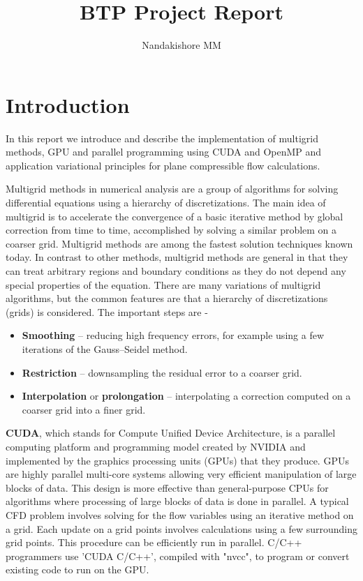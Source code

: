 \documentclass[a4paper]{report}
\author{Nandakishore MM}
\title{BTP Project Report}
\begin{document}
	\maketitle
	
	\newpage
	\tableofcontents
	\newpage
	\listoffigures
	\newpage
	\listoftables
	\newpage
	
	
	\chapter{Introduction}
	In this report we introduce and describe the implementation of multigrid methods, GPU and parallel programming using CUDA and OpenMP and application variational principles for plane compressible flow calculations. 
	
	Multigrid methods in numerical analysis are a group of algorithms for solving differential equations using a hierarchy of discretizations.
	The main idea of multigrid is to accelerate the convergence of a basic iterative method by global correction from time to time, accomplished by solving a similar problem on a coarser grid.
	Multigrid methods are among the fastest solution techniques known today.
	In contrast to other methods, multigrid methods are general in that they can treat arbitrary regions and boundary conditions as they do not depend any special properties of the equation.
	There are many variations of multigrid algorithms, but the common features are that a hierarchy of discretizations (grids) is considered. The important steps are \cite{multigrid}-
	\begin{itemize}
		\item \textbf{Smoothing} – reducing high frequency errors, for example using a few iterations of the Gauss–Seidel method.
		\item \textbf{Restriction} – downsampling the residual error to a coarser grid.
		\item \textbf{Interpolation} or \textbf{prolongation} – interpolating a correction computed on a coarser grid into a finer grid.
	\end{itemize}
	
	\textbf{CUDA}, which stands for Compute Unified Device Architecture, is a parallel computing platform and programming model created by NVIDIA and implemented by the graphics processing units (GPUs) that they produce.
	GPUs are highly parallel multi-core systems allowing very efficient manipulation of large blocks of data. 
	This design is more effective than general-purpose CPUs for algorithms where processing of large blocks of data is done in parallel.
	A typical CFD problem involves solving for the flow variables using an iterative method on a grid. Each update on a grid points involves calculations using a few surrounding grid points. This procedure can be efficiently run in parallel.
	C/C++ programmers use 'CUDA C/C++', compiled with "nvcc", to program or convert existing code to run on the GPU. 
	
\end{document}

